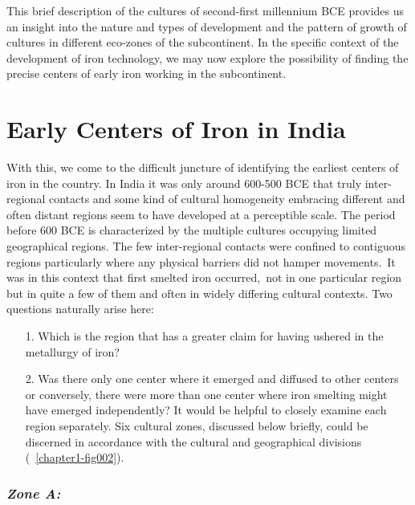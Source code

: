 This brief description of the cultures of second-first millennium BCE provides us an insight into the nature and types of development and the pattern of growth of cultures in different eco-zones of the subcontinent. In the specific context of the development of iron technology, we may now explore the possibility of finding the precise centers of early iron working in the subcontinent.

\vspace{-.2cm}

\section*{Early Centers of Iron in India}\label{chapter3-section-4}

With this, we come to the difficult juncture of identifying the earliest centers of iron in the country. In India it was only around 600-500 BCE that truly inter-regional contacts and some kind of cultural homogeneity embracing different and often distant regions seem to have developed at a perceptible scale. The period before 600 BCE is characterized by the multiple cultures occupying limited geographical regions. The few inter-regional contacts were confined to contiguous regions particularly where any physical barriers did not hamper movements.~It was in this context that first smelted iron occurred,~not in one particular region but in quite a few of them and often in widely differing cultural contexts. Two questions naturally arise here: 
\begin{itemize}
\item[1.] Which is the region that has a greater claim for having ushered in the metallurgy of iron?

\item[2.] Was there only one center where it emerged and diffused to other centers or conversely, there were more than one center where iron smelting might have emerged independently? It would be helpful to closely examine each region separately. Six cultural zones, discussed below briefly, could be discerned in accordance with the cultural and geographical divisions (~\ref{chapter1-fig002}).
\end{itemize}

\vspace{-.3cm}

\subsubsection*{\textit{Zone A:}}

